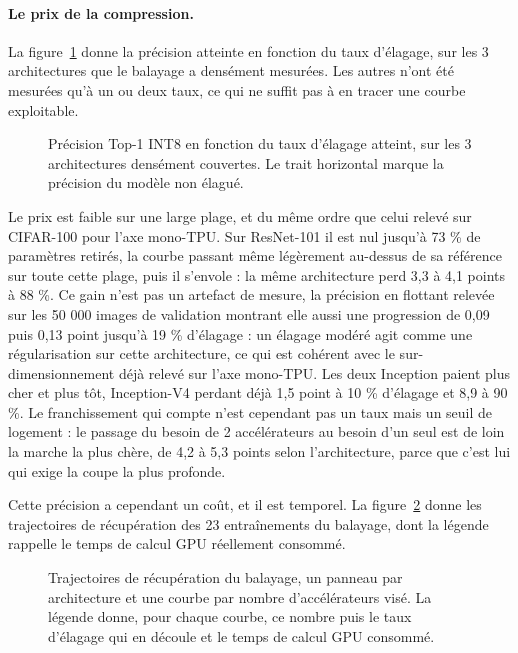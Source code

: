 \documentclass[11pt,a4paper]{report}
\begin{document}
\paragraph{Le prix de la compression.} La figure~\ref{fig:acccomp} donne la précision atteinte en fonction du taux d'élagage, sur les 3 architectures que le balayage a densément mesurées. Les autres n'ont été mesurées qu'à un ou deux taux, ce qui ne suffit pas à en tracer une courbe exploitable.

\begin{figure}[H]
    \centering
    
    \caption[Précision en fonction du taux d'élagage]{Précision Top-1 INT8 en fonction du taux d'élagage atteint, sur les 3 architectures densément couvertes. Le trait horizontal marque la précision du modèle non élagué.}
    \label{fig:acccomp}
\end{figure}

Le prix est faible sur une large plage, et du même ordre que celui relevé sur CIFAR-100 pour l'axe mono-TPU. Sur ResNet-101 il est nul jusqu'à 73 \% de paramètres retirés, la courbe passant même légèrement au-dessus de sa référence sur toute cette plage, puis il s'envole : la même architecture perd 3,3 à 4,1 points à 88 \%. Ce gain n'est pas un artefact de mesure, la précision en flottant relevée sur les 50 000 images de validation montrant elle aussi une progression de 0,09 puis 0,13 point jusqu'à 19 \% d'élagage : un élagage modéré agit comme une régularisation sur cette architecture, ce qui est cohérent avec le sur-dimensionnement déjà relevé sur l'axe mono-TPU. Les deux Inception paient plus cher et plus tôt, Inception-V4 perdant déjà 1,5 point à 10 \% d'élagage et 8,9 à 90 \%. Le franchissement qui compte n'est cependant pas un taux mais un seuil de logement : le passage du besoin de 2 accélérateurs au besoin d'un seul est de loin la marche la plus chère, de 4,2 à 5,3 points selon l'architecture, parce que c'est lui qui exige la coupe la plus profonde.

Cette précision a cependant un coût, et il est temporel. La figure~\ref{fig:ft_sweep} donne les trajectoires de récupération des 23 entraînements du balayage, dont la légende rappelle le temps de calcul GPU réellement consommé.

\begin{figure}[H]
    \centering
    
    \caption[Trajectoires de récupération de l'axe multi-TPU]{Trajectoires de récupération du balayage, un panneau par architecture et une courbe par nombre d'accélérateurs visé. La légende donne, pour chaque courbe, ce nombre puis le taux d'élagage qui en découle et le temps de calcul GPU consommé.}
    \label{fig:ft_sweep}
\end{figure}
\end{document}
